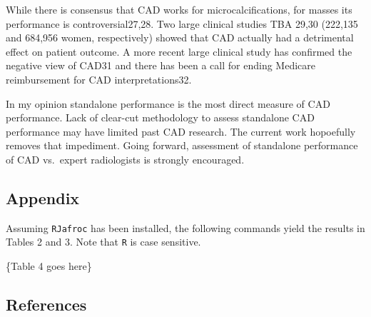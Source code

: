 \documentclass[
]{article}
\begin{document}
While there is consensus that CAD works for microcalcifications, for masses its performance is controversial27,28. Two large clinical studies TBA 29,30 (222,135 and 684,956 women, respectively) showed that CAD actually had a detrimental effect on patient outcome. A more recent large clinical study has confirmed the negative view of CAD31 and there has been a call for ending Medicare reimbursement for CAD interpretations32.

In my opinion standalone performance is the most direct measure of CAD performance. Lack of clear-cut methodology to assess standalone CAD performance may have limited past CAD research. The current work hopoefully removes that impediment. Going forward, assessment of standalone performance of CAD vs.~expert radiologists is strongly encouraged.

\hypertarget{standalone-cad-radiologists-appendix}{%
\subsection{Appendix}\label{standalone-cad-radiologists-appendix}}

Assuming \texttt{RJafroc} has been installed, the following commands yield the results in Tables 2 and 3. Note that \texttt{R} is case sensitive.

\{Table 4 goes here\}

\hypertarget{standalone-cad-radiologists-references}{%
\subsection{References}\label{standalone-cad-radiologists-references}}
\end{document}
